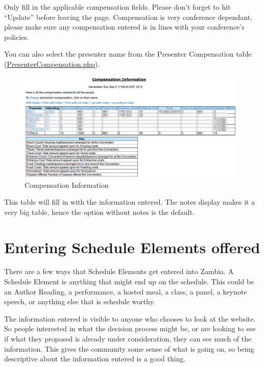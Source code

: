 \documentclass[tablesignature]{scrartcl}
\begin{document}
  Only fill in the applicable compensation fields.  Please don't
  forget to hit ``Update'' before leaving the page.  Compensation is
  very conference dependant, please make sure any compensation entered
  is in lines with your conference's policies.

  You can also select the presenter name from the Presenter
  Compensation table (\hyperref[PresenterCompensation.php]{PresenterCompensation.php}).

\begin{figure}[H]
\centering
\includegraphics[width=0.98\textwidth]{./Images/Compensation_Information.png}
\caption{\label{fig:Zambia_Presenter_Flow_Compensation_Information}Compensation Information}
\end{figure}

  This table will fill in with the information entered.  The notes
  display makes it a very big table, hence the option without notes is
  the default.
\section{Entering Schedule Elements offered}
\label{sec-5}


  There are a few ways that Schedule Elements get entered into Zambia.
  A Schedule Element is anything that might end up on the schedule.
  This could be an Author Reading, a performance, a hosted meal, a
  class, a panel, a keynote speech, or anything else that is schedule
  worthy. 

  The information entered is visible to anyone who chooses to look at
  the website.  So people interested in what the decision process
  might be, or are looking to see if what they proposed is already
  under consideration, they can see much of the information.  This
  gives the community some sense of what is going on, so being
  descriptive about the information entered is a good thing.
\end{document}
